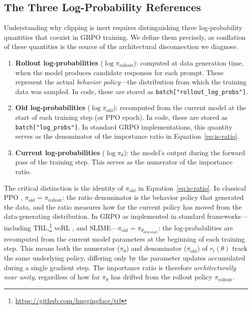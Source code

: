 \subsection{The Three Log-Probability References}
\label{sec:bg-three-logprobs}

Understanding why clipping is inert requires distinguishing three log-probability quantities that coexist in GRPO training.
We define them precisely, as conflation of these quantities is the source of the architectural disconnection we diagnose.

\begin{enumerate}
    \item \textbf{Rollout log-probabilities} ($\log \pi_{\text{rollout}}$): computed at data generation time, when the model produces candidate responses for each prompt.
    These represent the actual \emph{behavior policy}---the distribution from which the training data was sampled.
    In code, these are stored as \texttt{batch["rollout\_log\_probs"]}.

    \item \textbf{Old log-probabilities} ($\log \pi_{\text{old}}$): recomputed from the current model at the start of each training step (or PPO epoch).
    In code, these are stored as \texttt{batch["log\_probs"]}.
    In standard GRPO implementations, this quantity serves as the denominator of the importance ratio in Equation~\ref{eq:is-ratio}.

    \item \textbf{Current log-probabilities} ($\log \pi_\theta$): the model's output during the forward pass of the training step.
    This serves as the numerator of the importance ratio.
\end{enumerate}

The critical distinction is the identity of $\pi_{\text{old}}$ in Equation~\ref{eq:is-ratio}.
In classical PPO \citep{schulman2017ppo}, $\pi_{\text{old}} = \pi_{\text{rollout}}$: the ratio denominator is the behavior policy that generated the data, and the ratio measures how far the current policy has moved from the data-generating distribution.
In GRPO as implemented in standard frameworks---including TRL,\footnote{\url{https://github.com/huggingface/trl}} veRL \citep{verl2024}, and SLIME---$\pi_{\text{old}} = \pi_{\theta_{\text{step-start}}}$: the log-probabilities are recomputed from the current model parameters at the beginning of each training step.
This means both the numerator ($\pi_\theta$) and denominator ($\pi_{\text{old}}$) of $r_t(\theta)$ track the same underlying policy, differing only by the parameter updates accumulated during a single gradient step.
The importance ratio is therefore \emph{architecturally near unity}, regardless of how far $\pi_\theta$ has drifted from the rollout policy $\pi_{\text{rollout}}$.

